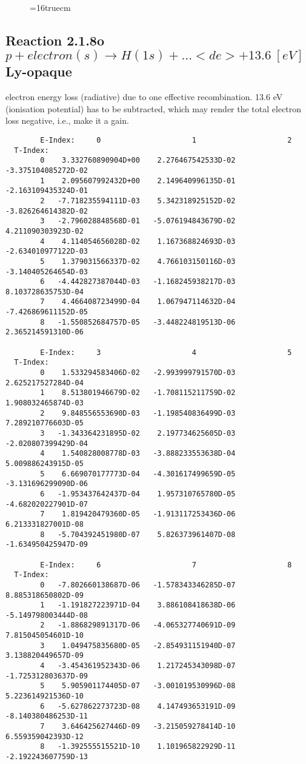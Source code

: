 \documentclass[12pt]{article}
\begin{document}
\begin{figure} \label{2.1.8lr2}
\epsfxsize=16truecm
\end{figure}
\newpage



\subsection{
  Reaction 2.1.8o $p + electron(s) \rightarrow H(1s) + ... <de>+13.6 \ [eV] $ Ly-opaque
}

  electron energy loss (radiative) due to one effective recombination.
  13.6 eV (ionisation potential) has to be
  subtracted, which may render the total electron loss negative, i.e., make it a gain.

\begin{small}\begin{verbatim}
        E-Index:     0                     1                     2
  T-Index:
        0    3.332760890904D+00    2.276467542533D-02   -3.375104085272D-02
        1    2.095607992432D+00    2.149640996135D-01   -2.163109435324D-01
        2   -7.718235594111D-03    5.342318925152D-02   -3.826264614382D-02
        3   -2.796028848568D-01   -5.076194843679D-02    4.211090303923D-02
        4    4.114054656028D-02    1.167368824693D-03   -2.634010977122D-03
        5    1.379031566337D-02    4.766103150116D-03   -3.140405264654D-03
        6   -4.442827387044D-03   -1.168245938217D-03    8.103728635753D-04
        7    4.466408723499D-04    1.067947114632D-04   -7.426869611152D-05
        8   -1.550852684757D-05   -3.448224819513D-06    2.365214591310D-06

        E-Index:     3                     4                     5
  T-Index:
        0    1.533294583406D-02   -2.993999791570D-03    2.625217527284D-04
        1    8.513801946679D-02   -1.708115211759D-02    1.908032465874D-03
        2    9.848556553690D-03   -1.198540836499D-03    7.289210776603D-05
        3   -1.343364231895D-02    2.197734625605D-03   -2.020807399429D-04
        4    1.540828008778D-03   -3.888233553638D-04    5.009886243915D-05
        5    6.669070177773D-04   -4.301617499659D-05   -3.131696299090D-06
        6   -1.953437642437D-04    1.957310765780D-05   -4.682020227901D-07
        7    1.819420479360D-05   -1.913117253436D-06    6.213331827001D-08
        8   -5.704392451980D-07    5.826373961407D-08   -1.634950425947D-09

        E-Index:     6                     7                     8
  T-Index:
        0   -7.802660138687D-06   -1.578343346285D-07    8.885318650802D-09
        1   -1.191827223971D-04    3.886108418638D-06   -5.149798003444D-08
        2   -1.886829891317D-06   -4.065327740691D-09    7.815045054601D-10
        3    1.049475835680D-05   -2.854931151940D-07    3.138820449657D-09
        4   -3.454361952343D-06    1.217245343098D-07   -1.725312803637D-09
        5    5.905901174405D-07   -3.001019530996D-08    5.223614921536D-10
        6   -5.627862273723D-08    4.147493653191D-09   -8.140380486253D-11
        7    3.646425627446D-09   -3.215059278414D-10    6.559359042393D-12
        8   -1.392555515521D-10    1.101965822929D-11   -2.192243607759D-13


\end{verbatim}
\end{small}
\end{document}
